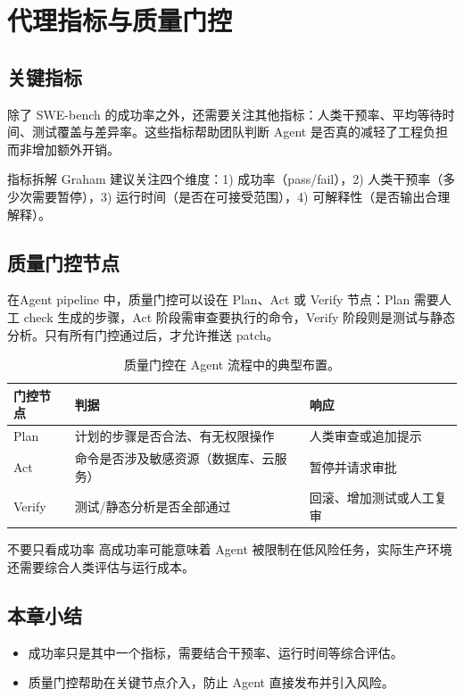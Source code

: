\section{代理指标与质量门控}
\subsection{关键指标}
除了 SWE-bench 的成功率之外，还需要关注其他指标：人类干预率、平均等待时间、测试覆盖与差异率。这些指标帮助团队判断 Agent 是否真的减轻了工程负担而非增加额外开销。

\begin{importantbox}{指标拆解}
Graham 建议关注四个维度：1) 成功率（pass/fail），2) 人类干预率（多少次需要暂停），3) 运行时间（是否在可接受范围），4) 可解释性（是否输出合理解释）。
\end{importantbox}

\subsection{质量门控节点}
在Agent pipeline 中，质量门控可以设在 Plan、Act 或 Verify 节点：Plan 需要人工 check 生成的步骤，Act 阶段需审查要执行的命令，Verify 阶段则是测试与静态分析。只有所有门控通过后，才允许推送 patch。

\begin{table}[H]
\centering
\begin{tabular}{p{} p{} p{}}
\toprule
门控节点 & 判据 & 响应 \\
\midrule
Plan & 计划的步骤是否合法、有无权限操作 & 人类审查或追加提示 \\
\midrule
Act & 命令是否涉及敏感资源（数据库、云服务） & 暂停并请求审批 \\
\midrule
Verify & 测试/静态分析是否全部通过 & 回滚、增加测试或人工复审 \\
\bottomrule
\end{tabular}
\caption{质量门控在 Agent 流程中的典型布置。}
\end{table}

\begin{warningbox}{不要只看成功率}
高成功率可能意味着 Agent 被限制在低风险任务，实际生产环境还需要综合人类评估与运行成本。
\end{warningbox}

\subsection{本章小结}
\begin{itemize}
    \item 成功率只是其中一个指标，需要结合干预率、运行时间等综合评估。
    \item 质量门控帮助在关键节点介入，防止 Agent 直接发布并引入风险。
\end{itemize}

